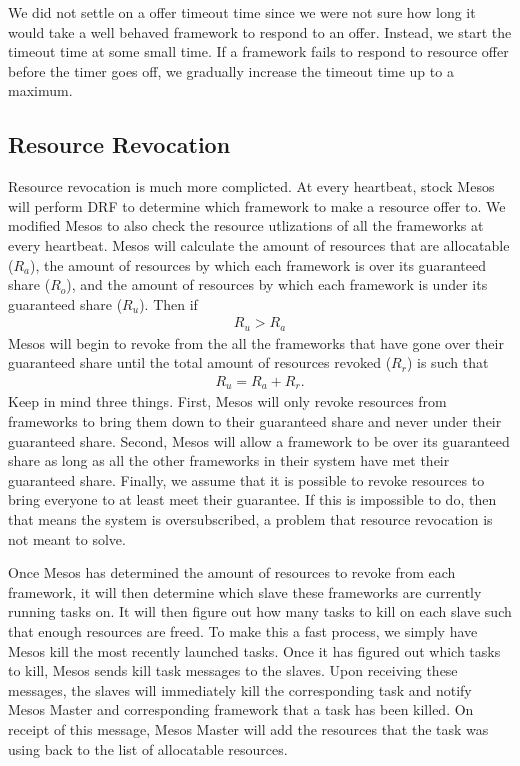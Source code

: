 We did not settle on a offer timeout time since we were not sure how long it would take a well behaved
framework to respond to an offer. Instead, we start the timeout time at some small time. If a framework
fails to respond to resource offer before the timer goes off, we gradually increase the timeout time
up to a maximum. 

\subsection{Resource Revocation}
Resource revocation is much more complicted. At every heartbeat, stock Mesos will perform DRF to
determine which framework to make a resource offer to. We modified Mesos to also check the resource
utlizations of all the frameworks at every heartbeat. Mesos will calculate the amount of resources that
are allocatable ($R_a$), the amount of resources by which each framework is over its guaranteed
share ($R_o$), and the amount of resources by which each framework is under its guaranteed share 
($R_u$). Then if 
\begin{align*}
  R_u > R_a
\end{align*}
Mesos will begin to revoke from the all the frameworks that have gone over their guaranteed share until
the total amount of resources revoked ($R_r$) is such that
\begin{align*}
  R_u = R_a + R_r.
\end{align*}
Keep in mind three things. First, Mesos will only revoke resources from frameworks to bring them down to
their guaranteed share and never under their guaranteed share. Second, Mesos will allow a framework to 
be over its guaranteed share as long as all the other frameworks in their system have met their
guaranteed share. Finally, we assume that it is possible to revoke resources to bring everyone to at
least meet their guarantee. If this is impossible to do, then that means the system is oversubscribed,
a problem that resource revocation is not meant to solve.

Once Mesos has determined the amount of resources to revoke from each framework, it will then determine
which slave these frameworks are currently running tasks on. It will then figure out how many tasks to
kill on each slave such that enough resources are freed. To make this a fast process, we simply have
Mesos kill the most recently launched tasks. Once it has figured out which tasks to kill, Mesos sends
kill task messages to the slaves. Upon receiving these messages, the slaves will immediately kill the
corresponding task and notify Mesos Master and corresponding framework that a task has been killed. On
receipt of this message, Mesos Master will add the resources that the task was using back to the list
of allocatable resources. 
